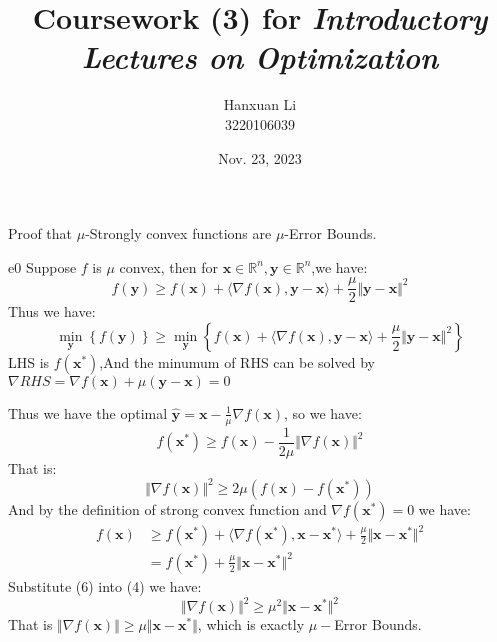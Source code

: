 \documentclass{article}
\title{Coursework (3) for \emph{Introductory Lectures on Optimization}}
\author{Hanxuan Li \\ 3220106039}
\date{Nov. 23, 2023}
\newcommand{\xB}{\bm{x}}
\newcommand{\yB}{\bm{y}}
\begin{document}
\maketitle

\begin{excercise}\label{e0}
Proof that $\mu$-Strongly convex functions are $\mu$-Error Bounds.
\end{excercise}
\begin{PROOF}{e0}
Suppose $f$ is $\mu$ convex, then for $\xB\in \mathbb{R}^n, \yB\in\mathbb{R}^n$,we have:
\begin{equation}
	f(\yB)\ge f(\xB)+\langle\nabla f(\xB),\yB-\xB\rangle+\frac{\mu}{2}\Vert \yB-\xB\Vert^2
\end{equation}
Thus we have:
\begin{equation}
	\mathop{\min}_{\yB}\left\{{f(\yB)}\right\}\ge \mathop{\min}_{\yB}\left\{f(\xB)+\langle\nabla f(\xB),\yB-\xB\rangle+\frac{\mu}{2}\Vert \yB-\xB\Vert^2\right\}
\end{equation}
LHS is $f(\xB^{*})$,And the minumum of RHS can be solved by$\nabla RHS=\nabla f(\xB)+\mu(\yB-\xB)=0$

Thus we have the optimal $\hat{\yB}=\xB-\frac{1}{\mu}\nabla f(\xB)$, so we have:
\begin{equation}
	f(\xB^{*})\ge f(\xB)-\frac{1}{2\mu}\Vert \nabla f(\xB)\Vert^2
\end{equation}
That is:
\begin{equation}
	\Vert\nabla f(\xB)\Vert^2\ge 2\mu (f(\xB)-f(\xB^{*}))
\end{equation}
And by the definition of strong convex function and $\nabla f(\xB^{*})=0$ we have:
\begin{align}
	f(\xB)&\ge f(\xB^{*})+\langle\nabla f(\xB^{*}),\xB-\xB^{*}\rangle+\frac{\mu}{2}\Vert \xB-\xB^{*}\Vert^2\\
	&=f(\xB^{*})+\frac{\mu}{2}\Vert\xB-\xB^{*}\Vert^2
\end{align}
Substitute (6) into (4) we have:
\begin{equation}
	\Vert\nabla f(\xB)\Vert^2\ge \mu ^2\Vert\xB-\xB^{*}\Vert^2
\end{equation}
That is $\Vert \nabla f(\xB)\Vert \ge \mu\Vert \xB-\xB^{*}\Vert$, which is exactly $\mu-$Error Bounds.
\end{PROOF}
\end{document}
